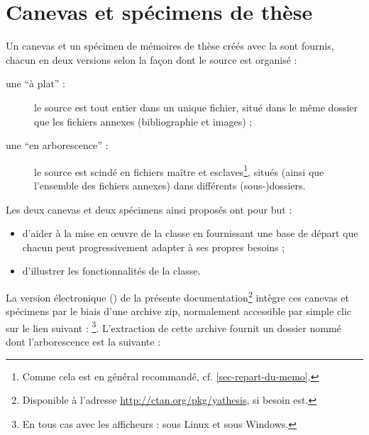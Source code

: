 \chapter{Canevas et spécimens de thèse}\label{cha-specimen-canevas}%

Un canevas et un spécimen de mémoires de thèse créés avec la \yatcl sont
fournis, chacun en deux versions selon la façon dont le source  est
organisé :
\begin{description}
\item[une \enquote{à plat} :] le source est tout entier dans un unique fichier,
  situé dans le même dossier que les fichiers annexes (bibliographie et
  images) ;
\item[une \enquote{en arborescence} :] le source est scindé en fichiers maître
  et esclaves\footnote{Comme cela est en général recommandé,
    cf. \vref{sec-repart-du-memo}.}, situés (ainsi que l'ensemble des fichiers
  annexes) dans différents (sous-)dossiers.
\end{description}
Les deux canevas et deux spécimens ainsi proposés ont pour but :
\begin{itemize}
\item d'aider à la mise en œuvre de la classe en fournissant une base de départ
  que chacun peut progressivement adapter à ses propres
  besoins ;
\item d'illustrer les fonctionnalités de la classe.
\end{itemize}

La version électronique (\pdf{}) de la présente
documentation\footnote{Disponible à l'adresse
  \url{http://ctan.org/pkg/yathesis}, si besoin est.} intègre ces canevas et
spécimens par le biais d'une archive \gls{zip}, normalement accessible par
simple clic sur le lien suivant :
\footnote{En
  tous cas avec les afficheurs \pdf:{}  sous Linux et
  \href{http://www.sumatrapdfreader.org/free-pdf-reader-fr.html}{}
  sous Windows.}. L'extraction
de cette archive fournit un dossier nommé  dont l'arborescence
est la suivante :

\setlength{\DTbaselineskip}{15pt}
\begin{tcolorbox}
\end{tcolorbox}

